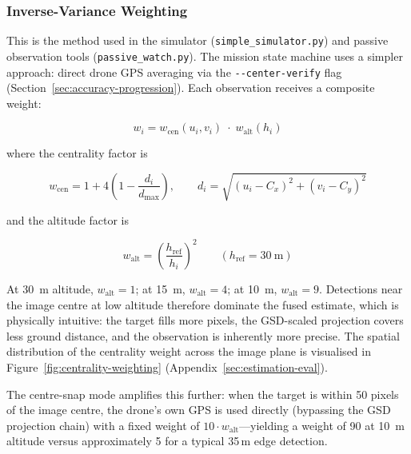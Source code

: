 \subsubsection{Inverse-Variance Weighting}\label{sec:ivw}

This is the method used in the simulator (\texttt{simple\_simulator.py}) and passive observation tools (\texttt{passive\_watch.py}).  The mission state machine uses a simpler approach: direct drone GPS averaging via the \texttt{-{}-center-verify} flag (Section~\ref{sec:accuracy-progression}).  Each observation receives a composite weight:

\begin{equation}\label{eq:weight-deep}
  w_i = w_\mathrm{cen}(u_i, v_i) \;\cdot\; w_\mathrm{alt}(h_i)
\end{equation}

\noindent where the centrality factor is

\begin{equation}
  w_\mathrm{cen} = 1 + 4\left(1 - \frac{d_i}{d_\mathrm{max}}\right),
  \qquad
  d_i = \sqrt{(u_i - C_x)^2 + (v_i - C_y)^2}
\end{equation}

\noindent and the altitude factor is

\begin{equation}\label{eq:alt-weight}
  w_\mathrm{alt} = \left(\frac{h_\mathrm{ref}}{h_i}\right)^2
  \qquad (h_\mathrm{ref} = \SI{30}{\metre})
\end{equation}

\noindent At \SI{30}{\metre} altitude, $w_\mathrm{alt} = 1$; at \SI{15}{\metre}, $w_\mathrm{alt} = 4$; at \SI{10}{\metre}, $w_\mathrm{alt} = 9$.  Detections near the image centre at low altitude therefore dominate the fused estimate, which is physically intuitive: the target fills more pixels, the GSD-scaled projection covers less ground distance, and the observation is inherently more precise.  The spatial distribution of the centrality weight across the image plane is visualised in Figure~\ref{fig:centrality-weighting} (Appendix~\ref{sec:estimation-eval}).

The centre-snap mode amplifies this further: when the target is within 50 pixels of the image centre, the drone's own GPS is used directly (bypassing the GSD projection chain) with a fixed weight of $10 \cdot w_\mathrm{alt}$---yielding a weight of 90 at \SI{10}{\metre} altitude versus approximately 5 for a typical 35\,m edge detection.

